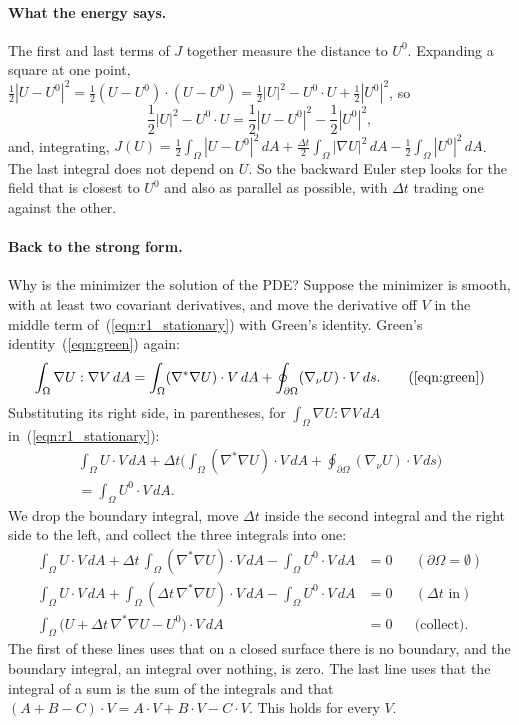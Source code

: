 \paragraph{What the energy says.} The first and last terms of $J$ together measure the distance to $U^0$. Expanding a square at one point, $\frac12|U - U^0|^2 = \frac12 (U - U^0)\cdot(U - U^0) = \frac12|U|^2 - U^0\cdot U + \frac12|U^0|^2$, so
\begin{equation*}
\frac12|U|^2 - U^0\cdot U = \frac12|U - U^0|^2 - \frac12|U^0|^2 ,
\end{equation*}
and, integrating, $J(U) = \frac12\int_\Omega |U - U^0|^2\, dA + \frac{\Delta t}{2}\int_\Omega |\nabla U|^2\, dA - \frac12\int_\Omega |U^0|^2\, dA$. The last integral does not depend on $U$. So the backward Euler step looks for the field that is closest to $U^0$ and also as parallel as possible, with $\Delta t$ trading one against the other.

\paragraph{Back to the strong form.} Why is the minimizer the solution of the PDE? Suppose the minimizer is smooth, with at least two covariant derivatives, and move the derivative off $V$ in the middle term of~(\ref{eqn:r1_stationary}) with Green's identity. Green's identity~(\ref{eqn:green}) again:
\begin{equation*}
\int_\Omega \nabla U : \nabla V\, dA = \int_\Omega (\nabla^* \nabla U) \cdot V\, dA + \oint_{\partial \Omega} (\nabla_\nu U) \cdot V\, ds. \tag{\ref{eqn:green}}
\end{equation*}
Substituting its right side, in parentheses, for $\int_\Omega \nabla U : \nabla V\, dA$ in~(\ref{eqn:r1_stationary}):
\begin{multline*}
\int_\Omega U\cdot V\, dA + \Delta t\Big( \int_\Omega (\nabla^*\nabla U)\cdot V\, dA + \oint_{\partial\Omega} (\nabla_\nu U)\cdot V\, ds \Big) \\
= \int_\Omega U^0 \cdot V\, dA .
\end{multline*}
We drop the boundary integral, move $\Delta t$ inside the second integral and the right side to the left, and collect the three integrals into one:
\begin{align*}
\int_\Omega U\cdot V\, dA + \Delta t\, \int_\Omega (\nabla^*\nabla U)\cdot V\, dA - \int_\Omega U^0 \cdot V\, dA &= 0 && (\partial\Omega = \emptyset) \\
\int_\Omega U\cdot V\, dA + \int_\Omega (\Delta t\, \nabla^*\nabla U)\cdot V\, dA - \int_\Omega U^0 \cdot V\, dA &= 0 && (\Delta t \text{ in}) \\
\int_\Omega \big( U + \Delta t\, \nabla^*\nabla U - U^0 \big)\cdot V\, dA &= 0 && \text{(collect)} .
\end{align*}
The first of these lines uses that on a closed surface there is no boundary, and the boundary integral, an integral over nothing, is zero. The last line uses that the integral of a sum is the sum of the integrals and that $(A + B - C)\cdot V = A\cdot V + B\cdot V - C\cdot V$. This holds for every $V$.

